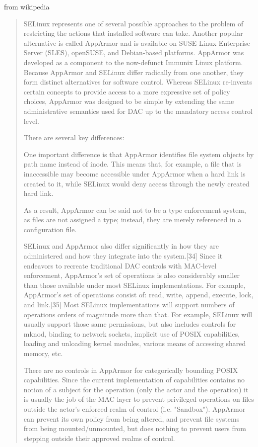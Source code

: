 from wikipedia

\begin{quote}
SELinux represents one of several possible approaches to the problem of restricting the actions that installed software can take. Another popular alternative is called AppArmor and is available on SUSE Linux Enterprise Server (SLES), openSUSE, and Debian-based platforms. AppArmor was developed as a component to the now-defunct Immunix Linux platform. Because AppArmor and SELinux differ radically from one another, they form distinct alternatives for software control. Whereas SELinux re-invents certain concepts to provide access to a more expressive set of policy choices, AppArmor was designed to be simple by extending the same administrative semantics used for DAC up to the mandatory access control level.

There are several key differences:

One important difference is that AppArmor identifies file system objects by path name instead of inode. This means that, for example, a file that is inaccessible may become accessible under AppArmor when a hard link is created to it, while SELinux would deny access through the newly created hard link.

As a result, AppArmor can be said not to be a type enforcement system, as files are not assigned a type; instead, they are merely referenced in a configuration file.

SELinux and AppArmor also differ significantly in how they are administered and how they integrate into the system.[34]
Since it endeavors to recreate traditional DAC controls with MAC-level enforcement, AppArmor's set of operations is also considerably smaller than those available under most SELinux implementations. For example, AppArmor's set of operations consist of: read, write, append, execute, lock, and link.[35] Most SELinux implementations will support numbers of operations orders of magnitude more than that. For example, SELinux will usually support those same permissions, but also includes controls for mknod, binding to network sockets, implicit use of POSIX capabilities, loading and unloading kernel modules, various means of accessing shared memory, etc.

There are no controls in AppArmor for categorically bounding POSIX capabilities. Since the current implementation of capabilities contains no notion of a subject for the operation (only the actor and the operation) it is usually the job of the MAC layer to prevent privileged operations on files outside the actor's enforced realm of control (i.e. "Sandbox"). AppArmor can prevent its own policy from being altered, and prevent file systems from being mounted/unmounted, but does nothing to prevent users from stepping outside their approved realms of control.


\end{quote}
